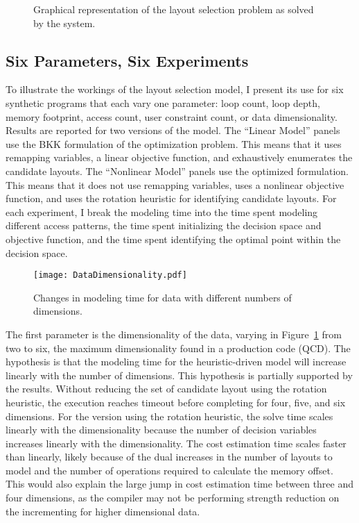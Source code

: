 \begin{figure}
\caption{Graphical representation of the layout selection problem as solved by the \FormatDecisions{} system.}
\end{figure}

\subsection{Six Parameters, Six Experiments}\label{sec:modelExperiments}

To illustrate the workings of the layout selection model, I present its use for six synthetic programs that each vary one parameter: loop count, loop depth, memory footprint, access count, user constraint count, or data dimensionality.
Results are reported for two versions of the model.
The ``Linear Model'' panels use the BKK formulation of the optimization problem.
This means that it uses remapping variables, a linear objective function, and exhaustively enumerates the candidate layouts.
The ``Nonlinear Model'' panels use the optimized \FormatDecisions{} formulation.
This means that it does not use remapping variables, uses a nonlinear objective function, and uses the rotation heuristic for identifying candidate layouts.
For each experiment, I break the modeling time into the time spent modeling different access patterns, the time spent initializing the decision space and objective function, and the time spent identifying the optimal point within the decision space. 


\begin{figure}
	\texttt{[image: DataDimensionality.pdf]}
	\caption{Changes in modeling time for data with different numbers of dimensions.}\label{DataDimensionality}
\end{figure}
The first parameter is the dimensionality of the data, varying in Figure~\ref{DataDimensionality} from two to six, the maximum dimensionality found in a production code (QCD).
The hypothesis is that the modeling time for the heuristic-driven model will increase linearly with the number of dimensions.
This hypothesis is partially supported by the results.
Without reducing the set of candidate layout using the rotation heuristic, the execution reaches timeout before completing for four, five, and six dimensions.
For the version using the rotation heuristic, the solve time scales linearly with the dimensionality because the number of decision variables increases linearly with the dimensionality.
The cost estimation time scales faster than linearly, likely because of the dual increases in the number of layouts to model and the number of operations required to calculate the memory offset. 
This would also explain the large jump in cost estimation time between three and four dimensions, as the compiler may not be performing strength reduction on the incrementing for higher dimensional data.

